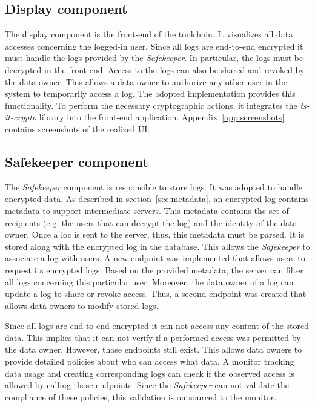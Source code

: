 \documentclass[../main.tex]{subfiles}
\begin{document}
\subsection{Display component}
The display component is the front-end of the toolchain.
It visualizes all data accesses concerning the logged-in user.
Since all logs are end-to-end encrypted it must handle the logs provided by the \textit{Safekeeper}.
In particular, the logs must be decrypted in the front-end.
Access to the logs can also be shared and revoked by the data owner.
This allows a data owner to authorize any other user in the system to temporarily access a log.
The adopted implementation provides this functionality.
To perform the necessary cryptographic actions, it integrates the \textit{ts-it-crypto} library into the front-end application.
Appendix~\ref{app:screenshots} contains screenshots of the realized UI.

\subsection{Safekeeper component}
The \textit{Safekeeper} component is responsible to store logs.
It was adopted to handle encrypted data.
As described in section~\ref{sec:metadata}, an encrypted log contains metadata to support intermediate servers.
This metadata contains the set of recipients (e.g. the users that can decrypt the log) and the identity of the data owner.
Once a loc is sent to the server, thus, this metadata must be parsed.
It is stored along with the encrypted log in the database.
This allows the \textit{Safekeeper} to associate a log with users.
A new endpoint was implemented that allows users to request its encrypted logs.
Based on the provided metadata, the server can filter all logs concerning this particular user.
Moreover, the data owner of a log can update a log to share or revoke access.
Thus, a second endpoint was created that allows data owners to modify stored logs.

Since all logs are end-to-end encrypted it can not access any content of the stored data.
This implies that it can not verify if a performed access was permitted by the data owner.
However, those endpoints still exist.
This allows data owners to provide detailed policies about who can access what data.
A monitor tracking data usage and creating corresponding logs can check if the observed access is allowed by calling those endpoints.
Since the \textit{Safekeeper} can not validate the compliance of these policies, this validation is outsourced to the monitor.
\end{document}
